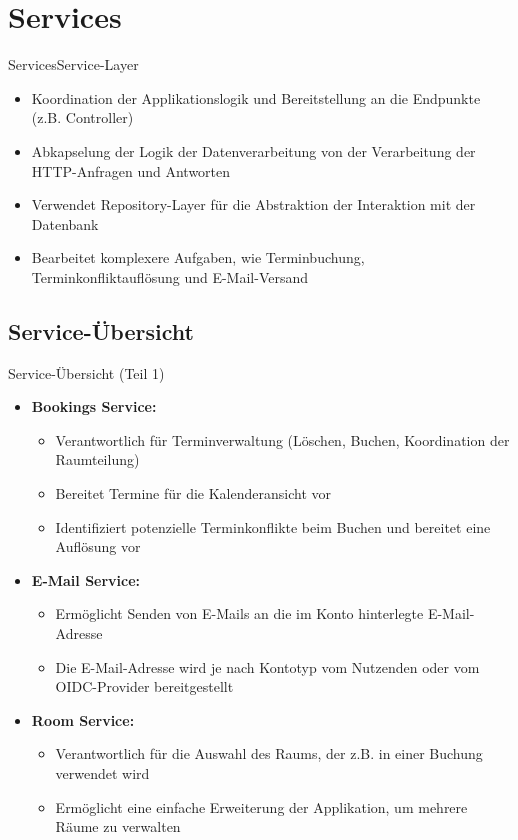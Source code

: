 \documentclass{sdqbeamer}
\begin{document}
\section{Services}

\begin{frame}{Services}{Service-Layer}
    \begin{itemize}
        \item Koordination der Applikationslogik und Bereitstellung an die Endpunkte (z.B. Controller)
        \item Abkapselung der Logik der Datenverarbeitung von der Verarbeitung der HTTP-Anfragen und Antworten
        \item Verwendet Repository-Layer für die Abstraktion der Interaktion mit der Datenbank
        \item Bearbeitet komplexere Aufgaben, wie Terminbuchung, Terminkonfliktauflösung und E-Mail-Versand
    \end{itemize}
\end{frame}

\subsection{Service-Übersicht}

\begin{frame}{Service-Übersicht (Teil 1)}
    \begin{itemize}
        \item \textbf{Bookings Service:}
        \begin{itemize}
            \item Verantwortlich für Terminverwaltung (Löschen, Buchen, Koordination der Raumteilung)
            \item Bereitet Termine für die Kalenderansicht vor
            \item Identifiziert potenzielle Terminkonflikte beim Buchen und bereitet eine Auflösung vor
        \end{itemize}
        \item \textbf{E-Mail Service:}
        \begin{itemize}
            \item Ermöglicht Senden von E-Mails an die im Konto hinterlegte E-Mail-Adresse
            \item Die E-Mail-Adresse wird je nach Kontotyp vom Nutzenden oder vom OIDC-Provider bereitgestellt
        \end{itemize}
        \item \textbf{Room Service:}
        \begin{itemize}
            \item Verantwortlich für die Auswahl des Raums, der z.B. in einer Buchung verwendet wird
            \item Ermöglicht eine einfache Erweiterung der Applikation, um mehrere Räume zu verwalten
        \end{itemize}
    \end{itemize}
\end{frame}
\end{document}
